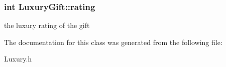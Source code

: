 \subsubsection[{\texorpdfstring{rating}{rating}}]{\setlength{\rightskip}{0pt plus 5cm}int Luxury\+Gift\+::rating}\hypertarget{classLuxuryGift_a1b7437bf65f5862686fb61a3da0d0b75}{}\label{classLuxuryGift_a1b7437bf65f5862686fb61a3da0d0b75}
the luxury rating of the gift 

The documentation for this class was generated from the following file\+:\begin{DoxyCompactItemize}
\item 
Luxury.\+h\end{DoxyCompactItemize}
